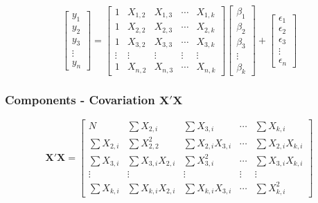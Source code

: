 \documentclass[
  letterpaper,
  DIV=11,
  numbers=noendperiod]{scrartcl}
\begin{document}
\[
\left[
\begin{matrix}
  y_1 \\
  y_2\\
  y_3  \\
  \vdots \\
  y_n    \nonumber
\end{matrix}  \right] 
= \left[
\begin{matrix}
  1& X_{1,2} & X_{1,3} & \cdots & X_{1,k} \\
  1 & X_{2,2} & X_{2,3} &\cdots & X_{2,k} \\
  1 & X_{3,2} & X_{3,3} &\cdots & X_{3,k} \\
  \vdots & \vdots & \vdots & \vdots & \vdots \\
  1 & X_{n,2} & X_{n,3} & \cdots & X_{n,k}  \nonumber
\end{matrix}  \right] 
\left[
\begin{matrix}
  \beta_1 \\
  \beta_2\\
  \beta_3  \\
  \vdots \\
  \beta_k    \nonumber
\end{matrix}  \right] 
+
\left[
\begin{matrix}
  \epsilon_1 \\
  \epsilon_2\\
  \epsilon_3  \\
  \vdots \\
  \epsilon_n    \nonumber
\end{matrix}  \right] 
\]

\subsubsection{\texorpdfstring{Components - Covariation
\(\mathbf{X'X}\)}{Components - Covariation \textbackslash mathbf\{X\textquotesingle X\}}}\label{components---covariation-mathbfxx}

\[
\mathbf{X'X}= \left[
\begin{matrix}
  N& \sum X_{2,i} & \sum X_{3,i} & \cdots & \sum X_{k,i} \\
  \sum X_{2,i}&\sum X_{2,2}^{2} & \sum X_{2,i} X_{3,i} &\cdots & \sum X_{2,i}X_{k,i} \\
  \sum X_{3,i} & \sum X_{3,i}X_{2,i}& \sum X_{3,i}^{2} &\cdots & \sum X_{3,i}X_{k,i} \\
  \vdots & \vdots & \vdots & \vdots & \vdots \\
  \sum X_{k,i} & \sum X_{k,i}X_{2,i} & \sum X_{k,i}X_{3,i} & \cdots & \sum X_{k,i}^{2}  \nonumber
\end{matrix}  \right] 
\]
\end{document}
